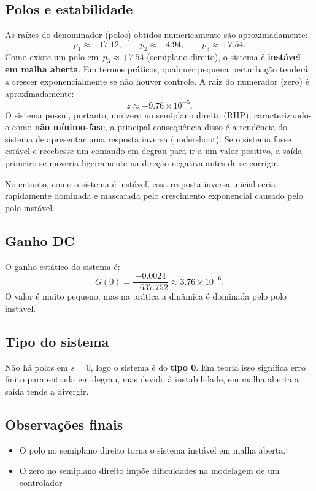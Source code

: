 \documentclass[9pt,a4paper,twocolumn,twoside]{tau-class/tau}
\begin{document}
\subsection{Polos e estabilidade}
As raízes do denominador (polos) obtidos numericamente são aproximadamente:
\[
p_1 \approx -17.12,\qquad p_2 \approx -4.94,\qquad p_3 \approx +7.54.
\]
Como existe um polo em \(\,p_3 \approx +7.54\) (semiplano direito), o sistema é \textbf{instável em malha aberta}. Em termos práticos, qualquer pequena perturbação tenderá a crescer exponencialmente se não houver controle.
A raiz do numerador (zero) é aproximadamente:
\[
z \approx +9.76\times 10^{-5}.
\]
O sistema possui, portanto, um zero no semiplano direito (RHP), caracterizando-o como \textbf{não mínimo-fase}, a principal consequência disso é a tendência do sistema de apresentar uma resposta inversa (undershoot). Se o sistema fosse estável e recebesse um comando em degrau para ir a um valor positivo, a saída primeiro se moveria ligeiramente na direção negativa antes de se corrigir.

No entanto, como o sistema é instável, essa resposta inversa inicial seria rapidamente dominada e mascarada pelo crescimento exponencial causado pelo polo instável.

\subsection{Ganho DC}
O ganho estático do sistema é:
\[
G(0)=\frac{-0.0024}{-637.752}\approx 3.76\times 10^{-6}.
\]
O valor é muito pequeno, mas na prática a dinâmica é dominada pelo polo instável.

\subsection{Tipo do sistema}
Não há polos em $s=0$, logo o sistema é do \textbf{tipo 0}. Em teoria isso significa erro finito para entrada em degrau, mas devido à instabilidade, em malha aberta a saída tende a divergir.

\subsection{Observações finais}
\begin{itemize}
    \item O polo no semiplano direito torna o sistema instável em malha aberta.
    \item O zero no semiplano direito impõe dificuldades na modelagem de um controlador 
\end{itemize}
\end{document}
